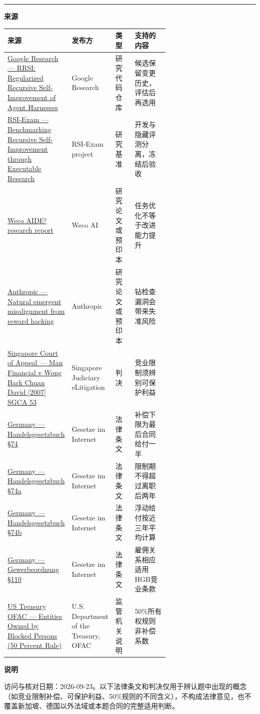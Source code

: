 \documentclass[a4paper,11pt]{ctexart}
\begin{document}
\bigskip\noindent\rule{\linewidth}{0.4pt}\par\smallskip
\begingroup\footnotesize\color{slate}
\textbf{来源}\par\smallskip
\setlength{\tabcolsep}{4pt}\renewcommand{\arraystretch}{1.2}\keepXColumns
\begin{tabularx}{\linewidth}{L{0.32\linewidth} L{0.20\linewidth} L{0.12\linewidth} X}
\toprule
\textbf{来源} & \textbf{发布方} & \textbf{类型} & \textbf{支持的内容} \\
\midrule
\href{https://github.com/google-research/rrsi}{Google Research — RRSI: Regularized Recursive Self-Improvement of Agent Harnesses} & Google Research & 研究代码仓库 & 候选保留变更历史，评估后再选用 \\
\href{https://rsi-exam.ai/}{RSI-Exam — Benchmarking Recursive Self-Improvement through Executable Research} & RSI-Exam project & 研究基准 & 开发与隐藏评测分离，冻结后验收 \\
\href{https://www.weco.ai/blog/first-evidence-of-recursive-self-improvement}{Weco AIDE² research report} & Weco AI & 研究论文或预印本 & 任务优化不等于改进能力提升 \\
\href{https://www.anthropic.com/research/emergent-misalignment-reward-hacking}{Anthropic — Natural emergent misalignment from reward hacking} & Anthropic & 研究论文或预印本 & 钻检查漏洞会带来失准风险 \\
\href{https://www.elitigation.sg/gd/s/2007_SGCA_53}{Singapore Court of Appeal — Man Financial v Wong Bark Chuan David [2007] SGCA 53} & Singapore Judiciary eLitigation & 判决 & 竞业限制须辨别可保护利益 \\
\href{https://www.gesetze-im-internet.de/hgb/__74.html}{Germany — Handelsgesetzbuch §74} & Gesetze im Internet & 法律条文 & 补偿下限为最后合同给付一半 \\
\href{https://www.gesetze-im-internet.de/hgb/__74a.html}{Germany — Handelsgesetzbuch §74a} & Gesetze im Internet & 法律条文 & 限制期不得超过离职后两年 \\
\href{https://www.gesetze-im-internet.de/hgb/__74b.html}{Germany — Handelsgesetzbuch §74b} & Gesetze im Internet & 法律条文 & 浮动给付按近三年平均计算 \\
\href{https://www.gesetze-im-internet.de/gewo/__110.html}{Germany — Gewerbeordnung §110} & Gesetze im Internet & 法律条文 & 雇佣关系相应适用HGB竞业条款 \\
\href{https://ofac.treasury.gov/faqs/topic/1521}{US Treasury OFAC — Entities Owned by Blocked Persons (50 Percent Rule)} & U.S. Department of the Treasury, OFAC & 监管机关说明 & 50\%所有权规则非补偿系数 \\
\bottomrule
\end{tabularx}
\endgroup


\clearpage
\begingroup\footnotesize\color{slate}
\noindent\textbf{说明}\par\smallskip
访问与核对日期：2026-09-23。以下法律条文和判决仅用于辨认题中出现的概念（如竞业限制补偿、可保护利益、50\%规则的不同含义），不构成法律意见，也不覆盖新加坡、德国以外法域或本题合同的完整适用判断。
\endgroup
\end{document}
